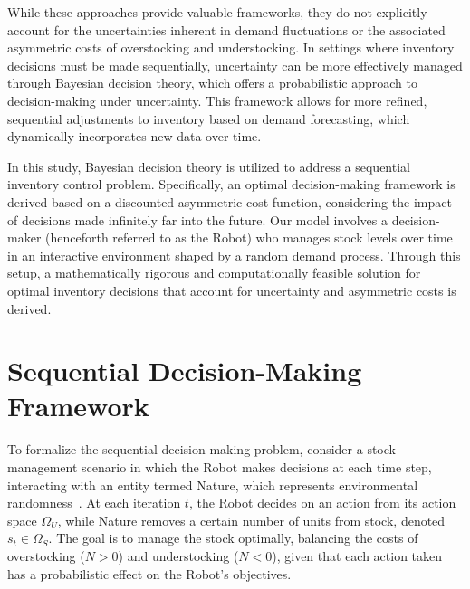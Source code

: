 \documentclass[a4paper,12pt]{article}
\begin{document}
	While these approaches provide valuable frameworks, they do not explicitly account for the uncertainties inherent in demand fluctuations or the associated asymmetric costs of overstocking and understocking. In settings where inventory decisions must be made sequentially, uncertainty can be more effectively managed through Bayesian decision theory, which offers a probabilistic approach to decision-making under uncertainty. This framework allows for more refined, sequential adjustments to inventory based on demand forecasting, which dynamically incorporates new data over time.
	
	In this study, Bayesian decision theory is utilized to address a sequential inventory control problem. Specifically, an optimal decision-making framework is derived based on a discounted asymmetric cost function, considering the impact of decisions made infinitely far into the future. Our model involves a decision-maker (henceforth referred to as the Robot) who manages stock levels over time in an interactive environment shaped by a random demand process. Through this setup, a mathematically rigorous and computationally feasible solution for optimal inventory decisions that account for uncertainty and asymmetric costs is derived.
	
	\section{Sequential Decision-Making Framework}
	To formalize the sequential decision-making problem, consider a stock management scenario in which the Robot makes decisions at each time step, interacting with an entity termed Nature, which represents environmental randomness~\citep{lavalle2006}. At each iteration $t$, the Robot decides on an action from its action space $\Omega_U$, while Nature removes a certain number of units from stock, denoted $s_t \in \Omega_S$. The goal is to manage the stock optimally, balancing the costs of overstocking ($N > 0$) and understocking ($N < 0$), given that each action taken has a probabilistic effect on the Robot’s objectives.
	
\end{document}
